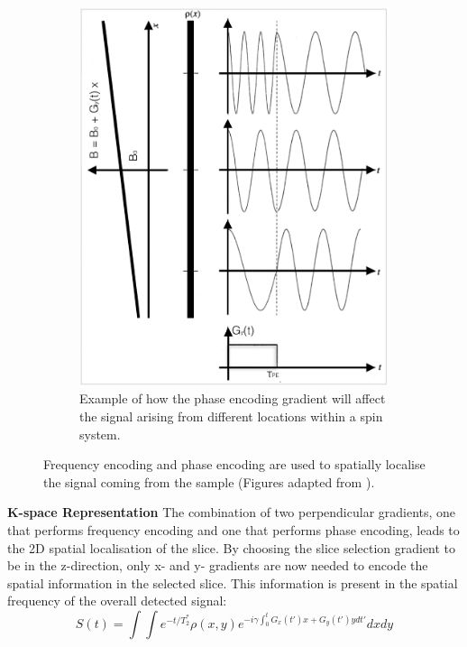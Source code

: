 \begin{figure}[ht]
\begin{subfigure}[b]{0.48\textwidth}
        \includegraphics[width=\textwidth]{images/mri/ch10phaseenc}
        \caption{Example of how the phase encoding gradient will affect the signal arising from different locations within a spin system.}
        \label{fig:ch10phaseenc}
    \end{subfigure}
    
    \caption{Frequency encoding and phase encoding are used to spatially localise the signal coming from the sample (Figures adapted from \cite{Liang2000}).}
    \label{fig:ch10freqphaseenc}
\end{figure}

\hfill

\textbf{K-space Representation}
The combination of two perpendicular gradients, one that performs frequency encoding and one that performs phase encoding, leads to the 2D spatial localisation of the slice.
By choosing the slice selection gradient to be in the z-direction, 
only x- and y- gradients are now needed to encode the spatial information in the selected slice.
This information is present in the spatial frequency of the overall detected signal:
\begin{equation}\label{eq:915}
    S(t) = \int \int 
            e^{-t/T_2^*} \rho(x,y) 
                e^{ -i \gamma \int_0^t G_x(t')x + G_y(t')y dt'} dx dy
\end{equation}

